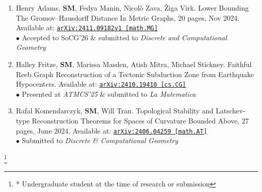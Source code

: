\documentclass[11pt]{article}
\begin{document}
\begin{enumerate}
\item[3.] Henry Adams, \textbf{SM}, Fedya Manin, Nicol\`o Zava, \v{Z}iga Virk. Lower Bounding The Gromov--Hausdorff Distance In Metric Graphs, 20 pages, Nov 2024.
Available at:
\href{https://arxiv.org/abs/2411.09182}{\tt arXiv:2411.09182v1 [math.MG]}\\
$\bullet$ Accepted to SoCG'26 \& submitted to \emph{Discrete and Computational Geometry}


\item [2.] Halley Fritze, \textbf{SM}, Marissa Masden, Atish Mitra, Michael Stickney. Faithful Reeb Graph Reconstruction of a Tectonic Subduction Zone from Earthquake Hypocenters. 
Available at:
\href{https://arxiv.org/abs/2410.19410}{\tt arXiv:2410.19410 [cs.CG]}\\
$\bullet$ Presented at \emph{ATMCS'25} \& submitted to \emph{La Matematica}


\item[1.] Rafal Komendarczyk, \textbf{SM}, Will Tran. Topological Stability and Latschev-type Reconstruction Theorems for Spaces of Curvature Bounded Above, 27 pages, June 2024. Available at:
\href{https://arxiv.org/abs/2406.04259}{\tt arXiv:2406.04259 [math.AT]}\\
$\bullet$ Submitted to \emph{Discrete \& Computational Geometry}

\end{enumerate}

\let\thefootnote\relax\footnote{* Undergraduate student at the time of research or submission}
\end{document}
